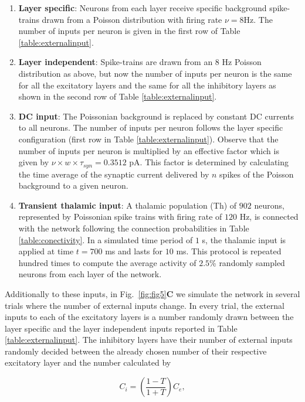 \documentclass[10pt,a4paper,onecolumn]{article}
\begin{document}
\begin{enumerate}
\item \textbf{Layer specific}: Neurons from each layer receive specific background spike-trains drawn from a Poisson distribution with firing rate $\nu = 8$Hz. The number of inputs per neuron is given in the first row of Table \ref{table:externalinput}.
\item \textbf{Layer independent}: Spike-trains are drawn from an $8$ Hz Poisson distribution as above, but now the number of inputs per neuron is the same for all the excitatory layers and the same for all the inhibitory layers as shown in the second row of Table \ref{table:externalinput}.
\item \textbf{DC input}: The Poissonian background is replaced by constant DC currents to all neurons. The number of inputs per neuron follows the layer specific configuration (first row in Table \ref{table:externalinput}). Observe that the number of inputs per neuron is multiplied by an effective factor which is given by $\nu \times w \times \tau_{syn}=0.3512$ pA. This factor is determined by calculating the time average of the synaptic current delivered by $n$ spikes of the Poisson background to a given neuron.
\item \textbf{Transient thalamic input}: A thalamic population (Th) of $902$ neurons, represented by Poissonian spike trains with firing rate of $120$ Hz, is connected with the network following the connection probabilities in Table \ref{table:conectivity}. In a simulated time period of $1$ s, the thalamic input is applied at time $t = 700$ ms and lasts for $10$ ms. This protocol is repeated hundred times to compute the average activity of $2.5$\% randomly sampled neurons from each layer of the network.
\end{enumerate}

Additionally to these inputs, in Fig.~\ref{fig:fig5}\textbf{C} we simulate the network in several trials where the number of external inputs change. In every trial, the external inputs to each of the excitatory layers is a number randomly drawn between the layer specific and the layer independent inputs reported in Table \ref{table:externalinput}. The inhibitory layers have their number of external inputs randomly decided between the already chosen number of their respective excitatory layer and the number calculated by 

\begin{equation}
  \label{Eq:transitivity}
  C_{i} = \left( \frac{1-T}{1+T} \right)C_{e} ,
\end{equation}
\end{document}
